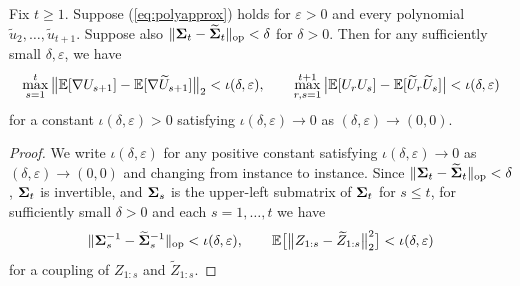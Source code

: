 \documentclass[10pt,reqno]{amsart}
\def\E{\mathbb{E}}
\def\op{\mathrm{op}}
\def\eps{\varepsilon}
\begin{document}
\begin{lemma}\label{lem:limit_law_compare}
Fix $t \geq 1$. Suppose (\ref{eq:polyapprox}) holds for $\eps>0$
and every polynomial $\tilde u_2,\ldots,\tilde u_{t+1}$. Suppose also
$\|\bSigma_t - \widetilde\bSigma_t\|_\op<\delta$ for $\delta>0$. Then for any
sufficiently small $\delta,\eps$, we have
\begin{align*}
\max_{s=1}^t \big\|\EE[\nabla U_{s+1}]-\EE[\nabla \widetilde U_{s+1}]
\big\|_2<\iota(\delta,\eps), \qquad
\max_{r, s = 1}^{t+1} \big|\EE[U_rU_s] 
- \EE[\widetilde U_r\widetilde U_s]\big|<\iota(\delta,\eps)
\end{align*}
for a constant $\iota(\delta,\eps)>0$ satisfying
$\iota(\delta,\eps) \to 0$ as $(\delta,\eps) \to (0,0)$.
\end{lemma}
\begin{proof}
We write $\iota(\delta,\eps)$ for any positive constant satisfying
$\iota(\delta,\eps) \to 0$ as $(\delta,\eps) \to (0,0)$ and changing from
instance to instance.
Since $\|\bSigma_t-\widetilde \bSigma_t\|_\op<\delta$, $\bm{\Sigma}_t$ is
invertible, and $\bm{\Sigma}_s$ is the upper-left submatrix of $\bm{\Sigma}_t$ for $s \leq t$,
for sufficiently small $\delta>0$ and each $s=1,\ldots,t$ we have
\begin{equation}\label{eq:Zcoupling}
\|\bSigma_s^{-1}-\widetilde \bSigma_s^{-1}\|_\op<\iota(\delta,\eps), \qquad
\E\big[\big\|Z_{1:s}-\widetilde Z_{1:s}\big\|_2^2\big]<\iota(\delta,\eps)
\end{equation}
for a coupling of $Z_{1:s}$ and $\widetilde Z_{1:s}$.


\end{proof}
\end{document}
